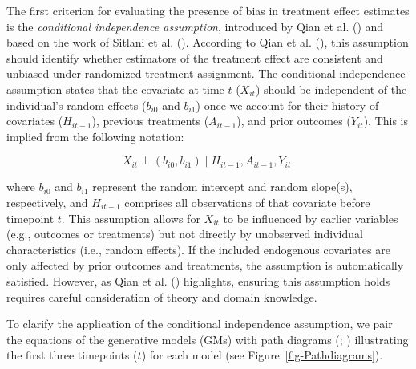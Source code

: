 \documentclass[
  11pt,
  a4paper,
]{article}
\begin{document}
The first criterion for evaluating the presence of bias in treatment
effect estimates is the \emph{conditional independence assumption},
introduced by Qian et al. () and based on
the work of Sitlani et al. (). According
to Qian et al. (), this assumption should
identify whether estimators of the treatment effect are consistent and
unbiased under randomized treatment assignment. The conditional
independence assumption states that the covariate at time \(t\)
(\(X_{it}\)) should be independent of the individual's random effects
(\(b_{i0}\) and \(b_{i1}\)) once we account for their history of
covariates (\(H_{it-1}\)), previous treatments (\(A_{it-1}\)), and prior
outcomes (\(Y_{it}\)). This is implied from the following notation:

\[ 
X_{it} \perp (b_{i0}, b_{i1}) \mid H_{it-1}, A_{it-1}, Y_{it}.
\]

where \(b_{i0}\) and \(b_{i1}\) represent the random intercept and
random slope(s), respectively, and \(H_{it-1}\) comprises all
observations of that covariate before timepoint \(t\). This assumption
allows for \(X_{it}\) to be influenced by earlier variables (e.g.,
outcomes or treatments) but not directly by unobserved individual
characteristics (i.e., random effects). If the included endogenous
covariates are only affected by prior outcomes and treatments, the
assumption is automatically satisfied. However, as Qian et al.
() highlights, ensuring this assumption
holds requires careful consideration of theory and domain knowledge.

To clarify the application of the conditional independence assumption,
we pair the equations of the generative models (GMs) with path diagrams
(;
) illustrating the first three
timepoints (\(t\)) for each model (see Figure~\ref{fig-Pathdiagrams}).
\end{document}
